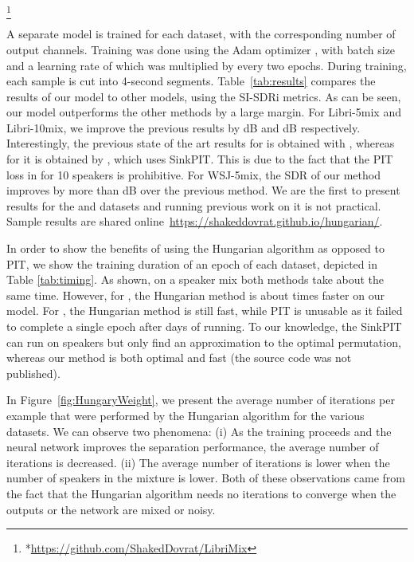 \documentclass[a4paper]{article}
\begin{document}
{\let\thefootnote\relax\footnote{{*\url{https://github.com/ShakedDovrat/LibriMix}}}}

A separate model is trained for each dataset, with the corresponding number of output channels. Training was done using the Adam optimizer \cite{kingma2014adam}, with batch size  and a learning rate of  which was multiplied by  every two epochs. During training, each sample is cut into 4-second segments. Table~\ref{tab:results} compares the results of our model to other models, using the SI-SDRi metrics.  As can be seen, our model outperforms the other methods by a large margin. For Libri-5mix and Libri-10mix, we improve the previous results by dB and dB respectively. Interestingly, the previous state of the art results for  is obtained with  \cite{nachmani2020voice}, whereas for  it is obtained by \cite{tachibana2020towards}, which uses SinkPIT. This is due to the fact that the PIT loss in  for 10 speakers is prohibitive. For WSJ-5mix, the SDR of our method improves by more than dB over the previous method. We are the first to present results for the  and  datasets and running previous work on it is not practical. Sample results are shared online~\url{https://shakeddovrat.github.io/hungarian/}.

 In order to show the benefits of using the Hungarian algorithm as opposed to PIT, we show the training duration of an epoch of each dataset, depicted in Table \ref{tab:timing}. As shown, on a  speaker mix both methods take about the same time. However, for , the Hungarian method is about  times faster on our model. For , the Hungarian method is still fast, while PIT is unusable as it failed to complete a single epoch after days of running. To our knowledge, the SinkPIT can run on  speakers but only find an approximation to the optimal permutation, whereas our method is both optimal and fast (the source code was not published). 

In Figure~\ref{fig:HungaryWeight}, we present the average number of iterations per example that were performed by the Hungarian algorithm for the various datasets. We can observe two phenomena: (i) As the training proceeds and the neural network improves the separation performance, the average number of iterations is decreased. (ii) The average number of iterations is lower when the number of speakers in the mixture is lower. Both of these observations came from the fact that the Hungarian algorithm needs no iterations to converge when the outputs or the network are mixed or noisy.
\end{document}
